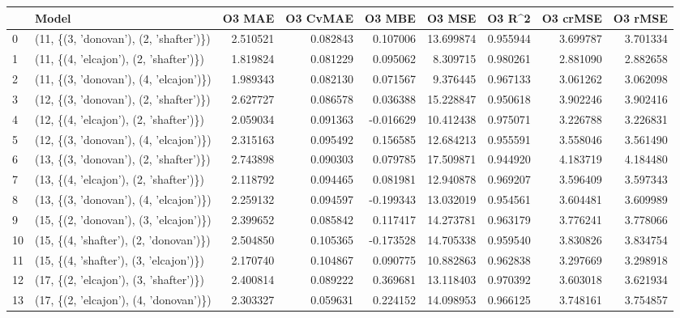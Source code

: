 \begin{tabular}{llrrrrrrr}
\toprule
{} &                                   Model &    O3 MAE &  O3 CvMAE &    O3 MBE &     O3 MSE &    O3 R\textasciicircum2 &  O3 crMSE &   O3 rMSE \\
\midrule
0  &  (11, \{(3, 'donovan'), (2, 'shafter')\}) &  2.510521 &  0.082843 &  0.107006 &  13.699874 &  0.955944 &  3.699787 &  3.701334 \\
1  &  (11, \{(4, 'elcajon'), (2, 'shafter')\}) &  1.819824 &  0.081229 &  0.095062 &   8.309715 &  0.980261 &  2.881090 &  2.882658 \\
2  &  (11, \{(3, 'donovan'), (4, 'elcajon')\}) &  1.989343 &  0.082130 &  0.071567 &   9.376445 &  0.967133 &  3.061262 &  3.062098 \\
3  &  (12, \{(3, 'donovan'), (2, 'shafter')\}) &  2.627727 &  0.086578 &  0.036388 &  15.228847 &  0.950618 &  3.902246 &  3.902416 \\
4  &  (12, \{(4, 'elcajon'), (2, 'shafter')\}) &  2.059034 &  0.091363 & -0.016629 &  10.412438 &  0.975071 &  3.226788 &  3.226831 \\
5  &  (12, \{(3, 'donovan'), (4, 'elcajon')\}) &  2.315163 &  0.095492 &  0.156585 &  12.684213 &  0.955591 &  3.558046 &  3.561490 \\
6  &  (13, \{(3, 'donovan'), (2, 'shafter')\}) &  2.743898 &  0.090303 &  0.079785 &  17.509871 &  0.944920 &  4.183719 &  4.184480 \\
7  &  (13, \{(4, 'elcajon'), (2, 'shafter')\}) &  2.118792 &  0.094465 &  0.081981 &  12.940878 &  0.969207 &  3.596409 &  3.597343 \\
8  &  (13, \{(3, 'donovan'), (4, 'elcajon')\}) &  2.259132 &  0.094597 & -0.199343 &  13.032019 &  0.954561 &  3.604481 &  3.609989 \\
9  &  (15, \{(2, 'donovan'), (3, 'elcajon')\}) &  2.399652 &  0.085842 &  0.117417 &  14.273781 &  0.963179 &  3.776241 &  3.778066 \\
10 &  (15, \{(4, 'shafter'), (2, 'donovan')\}) &  2.504850 &  0.105365 & -0.173528 &  14.705338 &  0.959540 &  3.830826 &  3.834754 \\
11 &  (15, \{(4, 'shafter'), (3, 'elcajon')\}) &  2.170740 &  0.104867 &  0.090775 &  10.882863 &  0.962838 &  3.297669 &  3.298918 \\
12 &  (17, \{(2, 'elcajon'), (3, 'shafter')\}) &  2.400814 &  0.089222 &  0.369681 &  13.118403 &  0.970392 &  3.603018 &  3.621934 \\
13 &  (17, \{(2, 'elcajon'), (4, 'donovan')\}) &  2.303327 &  0.059631 &  0.224152 &  14.098953 &  0.966125 &  3.748161 &  3.754857 \\

\end{tabular}
